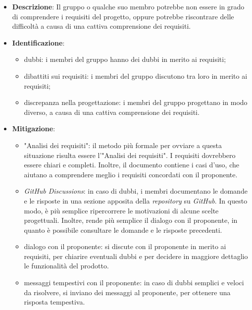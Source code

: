 \label{risk:comprensione dei requisiti carente}
\begin{itemize}
	\item \textbf{Descrizione}:
	      Il gruppo o qualche suo membro potrebbe non essere in grado di
	      comprendere i requisiti del progetto, oppure potrebbe riscontrare
	      delle difficoltà a causa di una cattiva comprensione dei requisiti.
	\item \textbf{Identificazione}:
	      \begin{itemize}
		      \item dubbi: i membri del gruppo hanno dei dubbi in merito ai
		            requisiti;

		      \item dibattiti sui requisiti: i membri del gruppo
		            discutono tra loro in merito ai requisiti;

		      \item discrepanza nella progettazione: i membri del gruppo
		            progettano in modo diverso, a causa di una cattiva
		            comprensione dei requisiti.
	      \end{itemize}
	\item \textbf{Mitigazione}:
	      \begin{itemize}
		      \item "Analisi dei requisiti": il metodo più formale per ovviare a
		            questa situazione risulta essere l'"Analisi dei requisiti".
		            I requisiti dovrebbero essere chiari e completi. Inoltre,
		            il documento contiene i casi d'uso, che aiutano a
		            comprendere meglio i requisiti concordati con il proponente.

		      \item \textit{GitHub Discussions}: in caso di dubbi, i membri
		            documentano le domande e le risposte in una sezione apposita
		            della \textit{repository} su \textit{GitHub}.
		            In questo modo, è più semplice ripercorrere le motivazioni
		            di alcune scelte progettuali. Inoltre, rende più semplice il
		            dialogo con il proponente, in quanto è possibile
		            consultare le domande e le risposte precedenti.

		      \item dialogo con il proponente: si discute con il proponente in
		            merito ai requisiti, per chiarire eventuali dubbi e per
		            decidere in maggiore dettaglio le funzionalità del prodotto.

		      \item messaggi tempestivi con il proponente: in caso di dubbi
		            semplici e veloci da risolvere, si inviano dei messaggi al
		            proponente, per ottenere una risposta tempestiva.
	      \end{itemize}
\end{itemize}
